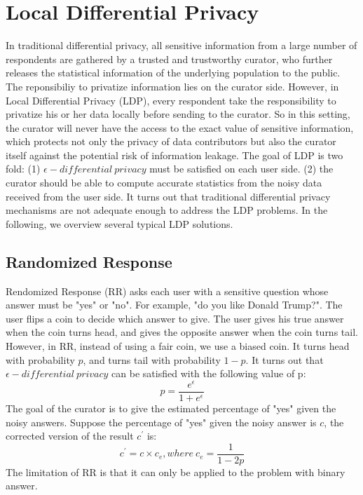 \documentclass[a4paper, 11pt]{article} %
\theoremstyle{definition}
\begin{document}
\section{Local Differential Privacy}
In traditional differential privacy\cite{dwork2008differential}, all sensitive information from a large number of respondents are gathered by a trusted and trustworthy curator, who further releases the statistical information of the underlying population to the public. The reponsibiliy to privatize information lies on the curator side. However, in Local Differential Privacy (LDP)\cite{gupta2013privately,kasiviswanathan2011can}, every respondent take the responsibility to privatize his or her data locally before sending to the curator. So in this setting, the curator will never have the access to the exact value of sensitive information, which protects not only the privacy of data contributors but also the curator itself against the potential risk of information leakage. The goal of LDP is two fold: (1) $\epsilon - differential \ privacy$ must be satisfied on each user side. (2) the curator should be able to compute accurate statistics from the noisy data received from the user side. It turns out that traditional differential privacy mechanisms are not adequate enough to address the LDP problems. In the following, we overview several typical LDP solutions.
\subsection{Randomized Response}
Rendomized Response (RR)\cite{erlingsson2014rappor} asks each user with a sensitive question whose answer must be "yes" or "no". For example, "do you like Donald Trump?". The user flips a coin to decide which answer to give. The user gives his true answer when the coin turns head, and gives the opposite answer when the coin turns tail. However, in RR, instead of using a fair coin, we use a biased coin. It turns head with probability $p$, and turns tail with probability $1-p$. It turns out that $\epsilon - differential \ privacy$ can be satisfied with the following value of p:
\[ p = \frac{e^\epsilon}{1+e^\epsilon} \]
The goal of the curator is to give the estimated percentage of "yes" given the noisy answers. Suppose the percentage of "yes" given the noisy answer is $c$, the corrected version of the result $c^\prime$ is:
\[ c^\prime = c \times c_{e}, where \ c_{e} = \frac{1}{1-2p}\]
The limitation of RR is that it can only be applied to the problem with binary answer.
\end{document}
